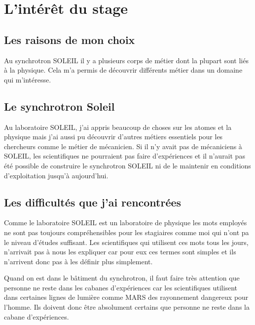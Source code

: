 \chapter{L'intérêt du stage}
	\minitoc
	





\section{Les raisons de mon choix}
    Au synchrotron SOLEIL il y a plusieurs corps de métier dont la plupart sont liés à la physique. Cela m'a permis de découvrir différents métier dans un domaine qui m'intéresse.
	
\section{Le synchrotron Soleil}
    Au laboratoire SOLEIL, j'ai appris beaucoup de choses sur les atomes et la physique mais j'ai aussi pu découvrir d'autres métiers essentiels pour les chercheurs comme le métier de mécanicien. Si il n'y avait pas de mécaniciens à SOLEIL, les scientifiques ne pourraient pas faire d'expériences et il n'aurait pas été possible de construire le synchrotron SOLEIL ni de le maintenir en conditions d'exploitation jusqu'à aujourd'hui. 

\section{Les difficultés que j'ai rencontrées}
    Comme le laboratoire SOLEIL est un laboratoire de physique les mots employés ne sont pas toujours compréhensibles pour les stagiaires comme moi qui n'ont pa le niveau d'études suffisant. Les scientifiques qui utilisent ces mots tous les jours,  n'arrivait pas à nous les expliquer car pour eux ces termes sont simples et ils n'arrivent donc pas à les définir plus simplement. 
    
    Quand on est dans le bâtiment du synchrotron, il faut faire très attention que personne ne reste dans les cabanes d'expériences car les scientifiques utilisent dans certaines lignes de lumière comme MARS des rayonnement dangereux pour l'homme. Ils doivent donc être absolument certains que personne ne reste dans la cabane d'expériences.

%
%